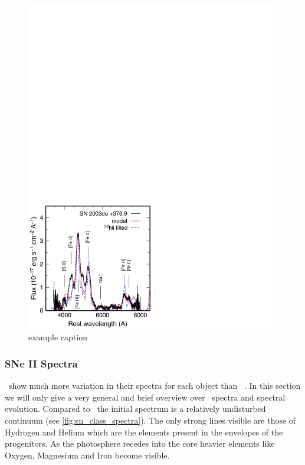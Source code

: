\begin{figure}[htbp] %
   \centering
   \includegraphics[width=\textwidth]{chapter_intro/plots/sn2003du_nebular.pdf} 
   \caption{example caption}
   \label{fig:sn2003du_nebular}
\end{figure}



\subsubsection{SNe II Spectra}
\sneii\ show much more variation in their spectra for each object than \sneia\ . In this section we will only give a very general and brief overview over \sneii\ spectra and spectral evolution. 
Compared to \sneia\ the initial spectrum is a relatively undisturbed continuum (see \ref{fig:sn_class_spectra}). The only strong lines visible are those of Hydrogen and Helium which are the elements present in the envelopes of the progenitors. 
As the photosphere recedes into the core heavier elements like Oxygen, Magnesium and Iron become visible. 

